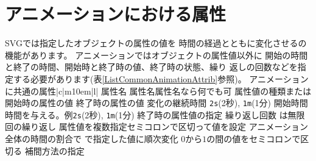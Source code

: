 \section{アニメーションにおける属性}
SVGでは指定したオブジェクトの属性の値を
時間の経過とともに変化させるの機能があります。
アニメーションではオブジェクトの属性値以外に
開始の時間と終了の時間、開始時と終了時の値、終了時の状態、繰り
返しの回数などを指定する必要があります(表\ref{ListCommonAnimationAttrib}参照)。
      {アニメーションに共通の属性}{|c|m{10em}|l|}
{{属性名}{}
         {}
{}{属性名}{属性名なら何でも可}
{}{属性値の種類}{または}
{}{開始時の属性の値}{\relax}
{}{終了時の属性の値}{\relax}
{}{変化の継続時間}
       {\texttt{2s}(2秒), \texttt{1m}(1分)}
{}{開始時間}
       {時間を与える。例\texttt{2s}(2秒), \texttt{1m}(1分)}
{}{終了時の属性値の指定}
    {}
{}{繰り返し回数}
    {は無限回の繰り返し}
{}{属性値を複数指定}{セミコロンで区切って値を設定}
{}{アニメーション全体の時間の割合で
  で指定した値に順次変化}
  {$0$から$1$の間の値をセミコロンで区切る}
{}{補間方法の指定}
         {}
}
